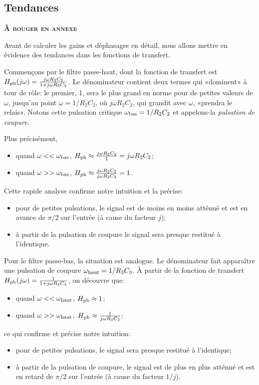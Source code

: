 \subsection{Tendances}

\textbf{\textsc{À bouger en annexe}}

Avant de calculer les gains et déphasages en détail,
nous allons mettre en évidence des tendances dans les fonctions de transfert.

Commençons par le filtre passe-haut, dont la fonction de transfert est
$H_{\mathrm{ph}}(j\omega) = \frac{j\omega R_2C_2}{1+j\omega R_2C_2}$.
Le dénominateur contient deux termes qui «dominent» à tour de rôle:
le premier, 1, sera le plus grand en norme pour de petites valeurs de $\omega$,
jusqu'au point $\omega = 1/R_2C_2$, où $j\omega R_2C_2$, qui grandit
avec $\omega$, «prendra le relais».
Notons cette pulsation critique $\omega_{\mathrm{bas}}= 1/R_2C_2$ et
appelons-la \emph{pulsation de coupure}.

Plus précisément,
\begin{itemize}
    \item quand $\omega << \omega_{\mathrm{bas}}$,
        $H_{\mathrm{ph}} \approx \frac{j\omega R_2C_2}{1} = j\omega R_2C_2$;
    \item quand $\omega >> \omega_{\mathrm{bas}}$,
        $H_{\mathrm{ph}} \approx \frac{j\omega R_2C_2}{j\omega R_2C_2} = 1$.
\end{itemize}

Cette rapide analyse confirme notre intuition et la précise:
\begin{itemize}
    \item pour de petites pulsations,
        le signal est de moins en moins atténué et est en avance de $\pi/2$
        sur l'entrée (à cause du facteur $j$);
    \item à partir de la pulsation de coupure le signal sera presque
        restitué à l'identique.
\end{itemize}

Pour le filtre passe-bas, la situation est analogue.
Le dénominateur fait apparaître une pulsation de coupure
$\omega_{\mathrm{haut}} = 1/R_3C_3$.
À partir de la fonction de transfert
$H_{\mathrm{pb}}(j\omega) = \frac{1}{1 + j\omega R_3C_3}$,
on découvre que:
\begin{itemize}
    \item quand $\omega << \omega_{\mathrm{haut}}$, $H_{\mathrm{pb}} \approx 1$;
    \item quand $\omega >> \omega_{\mathrm{haut}}$, $H_{\mathrm{pb}}
        \approx \frac{1}{j\omega R_3C_3}$;
\end{itemize}
ce qui confirme et précise notre intuition:
\begin{itemize}
    \item pour de petites pulsations, le signal sera presque restitué
        à l'identique;
    \item à partir de la pulsation de coupure, le signal est de plus en plus
        atténué
        et est en retard de $\pi/2$ sur l'entrée (à cause du facteur $1/j$).
\end{itemize}

